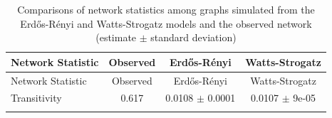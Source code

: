 \documentclass[12pt,twoside]{amherstthesis}
\begin{document}
  \begin{longtable}[]{@{}lccc@{}}
  \caption{Comparisons of network statistics among graphs simulated from
  the Erdős-Rényi and Watts-Strogatz models and the observed network
  (estimate \(\pm\) standard deviation)
  \label{tab:erwsdescstats}}\tabularnewline
  \toprule
  \begin{minipage}[b]{0.18\columnwidth}\raggedright\strut
  Network Statistic\strut
  \end{minipage} & \begin{minipage}[b]{0.13\columnwidth}\centering\strut
  Observed\strut
  \end{minipage} & \begin{minipage}[b]{0.29\columnwidth}\centering\strut
  Erdős-Rényi\strut
  \end{minipage} & \begin{minipage}[b]{0.29\columnwidth}\centering\strut
  Watts-Strogatz\strut
  \end{minipage}\tabularnewline
  \midrule
  \endfirsthead
  \toprule
  \begin{minipage}[b]{0.18\columnwidth}\raggedright\strut
  Network Statistic\strut
  \end{minipage} & \begin{minipage}[b]{0.13\columnwidth}\centering\strut
  Observed\strut
  \end{minipage} & \begin{minipage}[b]{0.29\columnwidth}\centering\strut
  Erdős-Rényi\strut
  \end{minipage} & \begin{minipage}[b]{0.29\columnwidth}\centering\strut
  Watts-Strogatz\strut
  \end{minipage}\tabularnewline
  \midrule
  \endhead
  \begin{minipage}[t]{0.18\columnwidth}\raggedright\strut
  Transitivity\strut
  \end{minipage} & \begin{minipage}[t]{0.13\columnwidth}\centering\strut
  0.617\strut
  \end{minipage} & \begin{minipage}[t]{0.29\columnwidth}\centering\strut
  0.0108 \(\pm\) 0.0001\strut
  \end{minipage} & \begin{minipage}[t]{0.29\columnwidth}\centering\strut
  0.0107 \(\pm\) 9e-05\strut
  \end{minipage}\tabularnewline
  \begin{minipage}[t]{0.18\columnwidth}\raggedright\strut

\end{minipage}
\end{longtable}
\end{document}
